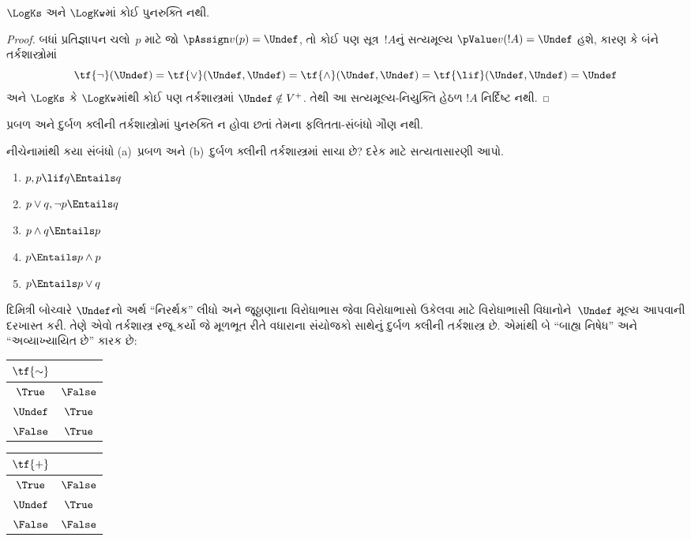 \begin{prop}
  $\LogKs$ અને $\LogKw$માં કોઈ પુનરુક્તિ નથી.
\end{prop}

\begin{proof}
  બધાં પ્રતિજ્ઞાપન ચલો~$p$ માટે જો
  $\pAssign v(p) = \Undef$, તો કોઈ પણ સૂત્ર~$!A$નું સત્યમૂલ્ય
  $\pValue v(!A) = \Undef$ હશે, કારણ કે બંને તર્કશાસ્ત્રોમાં
  \[
    \tf{\lnot}(\Undef) = \tf{\lor}(\Undef, \Undef) = \tf{\land}(\Undef,
  \Undef) = \tf{\lif}(\Undef, \Undef) = \Undef
  \]
  અને $\LogKs$ કે $\LogKw$માંથી કોઈ પણ તર્કશાસ્ત્રમાં
  $\Undef \notin V^+$.
  તેથી આ સત્યમૂલ્ય-નિયુક્તિ હેઠળ $!A$ નિર્દિષ્ટ નથી.
\end{proof}

પ્રબળ અને દુર્બળ ક્લીની તર્કશાસ્ત્રોમાં પુનરુક્તિ ન હોવા છતાં
તેમના ફલિતતા-સંબંધો ગૌણ નથી.

\begin{prob}
  નીચેનામાંથી કયા સંબંધો (a)~પ્રબળ અને (b)~દુર્બળ ક્લીની
  તર્કશાસ્ત્રમાં સાચા છે? દરેક માટે સત્યતાસારણી આપો.
  \begin{enumerate}
    \item $p, p \lif q \Entails q$
    \item $p \lor q, \lnot p \Entails q$
    \item $p \land q \Entails p$
    \item $p \Entails p \land p$
    \item $p \Entails p \lor q$
  \end{enumerate}
\end{prob}

દિમિત્રી બોચ્વારે $\Undef$નો અર્થ ``નિરર્થક'' લીધો અને
જૂઠ્ઠાણાના વિરોધાભાસ જેવા વિરોધાભાસો ઉકેલવા માટે વિરોધાભાસી
વિધાનોને~$\Undef$ મૂલ્ય આપવાની દરખાસ્ત કરી. તેણે એવો તર્કશાસ્ત્ર
રજૂ કર્યો જે મૂળભૂત રીતે વધારાના સંયોજકો સાથેનું દુર્બળ ક્લીની
તર્કશાસ્ત્ર છે. એમાંથી બે ``બાહ્ય નિષેધ'' અને ``અવ્યાખ્યાયિત છે''
કારક છે:
\begin{center}
  \begin{tabular}{c|c}
    $\tf{\sim}$ & \\
    \hline
    $\True$ & $\False$ \\
    $\Undef$ & $\True$ \\
    $\False$ & $\True$
  \end{tabular}
\quad
  \begin{tabular}{c|c}
    $\tf{+}$ & \\
    \hline
    $\True$ & $\False$ \\
    $\Undef$ & $\True$ \\
    $\False$ & $\False$
  \end{tabular}
\end{center}

